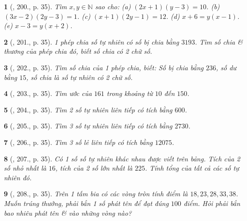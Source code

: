 \documentclass{article}
\newtheorem{baitoan}{}
\begin{document}
\begin{baitoan}[\cite{Binh_Toan_6_tap_1}, 200., p. 35]
	Tìm $x,y\in\mathbb{N}$ sao cho: (a) $(2x + 1)(y - 3) = 10$. (b) $(3x - 2)(2y - 3) = 1$. (c) $(x + 1)(2y - 1) = 12$. (d) $x + 6 = y(x - 1)$. (e) $x - 3 = y(x + 2)$.
\end{baitoan}

\begin{baitoan}[\cite{Binh_Toan_6_tap_1}, 201., p. 35]
	1 phép chia số tự nhiên có số bị chia bằng $3193$. Tìm số chia \& thương của phép chia đó, biết số chia có 2 chữ số.
\end{baitoan}

\begin{baitoan}[\cite{Binh_Toan_6_tap_1}, 202., p. 35]
	Tìm số chia của 1 phép chia, biết: Số bị chia bằng $236$, số dư bằng $15$, số chia là số tự nhiên có 2 chữ số.
\end{baitoan}	

\begin{baitoan}[\cite{Binh_Toan_6_tap_1}, 203., p. 35]
	Tìm ước của $161$ trong khoảng từ $10$ đến $150$.
\end{baitoan}

\begin{baitoan}[\cite{Binh_Toan_6_tap_1}, 204., p. 35]
	Tìm 2 số tự nhiên liên tiếp có tích bằng $600$.
\end{baitoan}

\begin{baitoan}[\cite{Binh_Toan_6_tap_1}, 205., p. 35]
	Tìm 3 số tự nhiên liên tiếp có tích bằng $2730$.
\end{baitoan}

\begin{baitoan}[\cite{Binh_Toan_6_tap_1}, 206., p. 35]
	Tìm 3 số lẻ liên tiếp có tích bằng $12075$.
\end{baitoan}

\begin{baitoan}[\cite{Binh_Toan_6_tap_1}, 207., p. 35]
	Có 1 số số tự nhiên khác nhau được viết trên bảng. Tích của 2 số nhỏ nhất là $16$, tích của 2 số lớn nhất là $225$. Tính tổng của tất cả các số tự nhiên đó.
\end{baitoan}

\begin{baitoan}[\cite{Binh_Toan_6_tap_1}, 208., p. 35]
	Trên 1 tấm bia có các vòng tròn tính điểm là $18,23,28,33,38$. Muốn trúng thưởng, phải bắn 1 số phát tên để đạt đúng $100$ điểm. Hỏi phải bắn bao nhiêu phát tên \& vào những vòng nào?
\end{baitoan}
\end{document}
